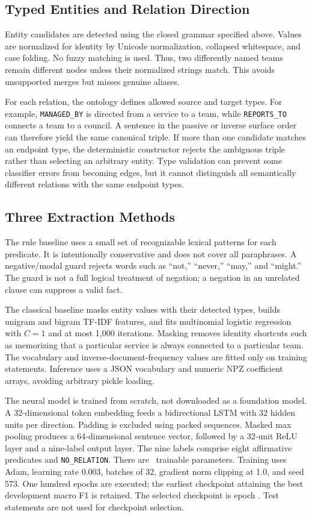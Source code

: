 \documentclass[conference]{IEEEtran}
\newcommand{\pred}[1]{\texttt{#1}}
\begin{document}
\subsection{Typed Entities and Relation Direction}
Entity candidates are detected using the closed grammar specified above. Values are normalized for identity by Unicode normalization, collapsed whitespace, and case folding. No fuzzy matching is used. Thus, two differently named teams remain different nodes unless their normalized strings match. This avoids unsupported merges but misses genuine aliases.

For each relation, the ontology defines allowed source and target types. For example, \pred{MANAGED\_BY} is directed from a service to a team, while \pred{REPORTS\_TO} connects a team to a council. A sentence in the passive or inverse surface order can therefore yield the same canonical triple. If more than one candidate matches an endpoint type, the deterministic constructor rejects the ambiguous triple rather than selecting an arbitrary entity. Type validation can prevent some classifier errors from becoming edges, but it cannot distinguish all semantically different relations with the same endpoint types.

\subsection{Three Extraction Methods}
The rule baseline uses a small set of recognizable lexical patterns for each predicate. It is intentionally conservative and does not cover all paraphrases. A negative/modal guard rejects words such as ``not,'' ``never,'' ``may,'' and ``might.'' The guard is not a full logical treatment of negation; a negation in an unrelated clause can suppress a valid fact.

The classical baseline masks entity values with their detected types, builds unigram and bigram TF-IDF features, and fits multinomial logistic regression with $C=1$ and at most 1,000 iterations. Masking removes identity shortcuts such as memorizing that a particular service is always connected to a particular team. The vocabulary and inverse-document-frequency values are fitted only on training statements. Inference uses a JSON vocabulary and numeric NPZ coefficient arrays, avoiding arbitrary pickle loading.

The neural model is trained from scratch, not downloaded as a foundation model. A 32-dimensional token embedding feeds a bidirectional LSTM with 32 hidden units per direction. Padding is excluded using packed sequences. Masked max pooling produces a 64-dimensional sentence vector, followed by a 32-unit ReLU layer and a nine-label output layer. The nine labels comprise eight affirmative predicates and \pred{NO\_RELATION}. There are \ModelParameters\ trainable parameters. Training uses Adam, learning rate 0.003, batches of 32, gradient norm clipping at 1.0, and seed 573. One hundred epochs are executed; the earliest checkpoint attaining the best development macro F1 is retained. The selected checkpoint is epoch \SelectedEpoch. Test statements are not used for checkpoint selection.
\end{document}
